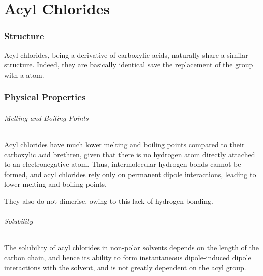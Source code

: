 

\pagebreak
\hypertarget{ChapterAcylChlorides}{}
\part{Acyl Chlorides}

	\section{Structure}

		Acyl chlorides, being a derivative of carboxylic acids, naturally share a similar structure. Indeed, they are basically identical
		save the replacement of the  group with a \ch{\Cl} atom.





	\section{Physical Properties}

		\paragraph{Melting and Boiling Points}

		Acyl chlorides have much lower melting and boiling points compared to their carboxylic acid brethren, given that there is no hydrogen
		atom directly attached to an electronegative atom. Thus, intermolecular hydrogen bonds cannot be formed, and acyl chlorides rely only
		on permanent dipole interactions, leading to lower melting and boiling points.

		They also do not dimerise, owing to this lack of hydrogen bonding.


		\paragraph{Solubility}

		The solubility of acyl chlorides in non-polar solvents depends on the length of the carbon chain, and hence its ability to form
		instantaneous dipole-induced dipole interactions with the solvent, and is not greatly dependent on the acyl group.

